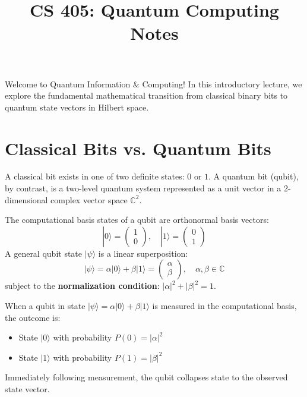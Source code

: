 \documentclass[mode=notes, palette=midnight, fontsize=11pt]{modernclassnotes}
\title{CS 405: Quantum Computing Notes}
\begin{document}
\maketitle

\tableofcontents
\newpage


Welcome to Quantum Information \& Computing! In this introductory lecture, we explore the fundamental mathematical transition from classical binary bits to quantum state vectors in Hilbert space.

\section{Classical Bits vs. Quantum Bits}

A classical bit exists in one of two definite states: $0$ or $1$. A quantum bit (qubit), by contrast, is a two-level quantum system represented as a unit vector in a 2-dimensional complex vector space $\mathbb{C}^2$.

\begin{definition}
The computational basis states of a qubit are orthonormal basis vectors:
\[
|0\rangle = \begin{pmatrix} 1 \\ 0 \end{pmatrix}, \quad |1\rangle = \begin{pmatrix} 0 \\ 1 \end{pmatrix}
\]
A general qubit state $|\psi\rangle$ is a linear superposition:
\[
|\psi\rangle = \alpha |0\rangle + \beta |1\rangle = \begin{pmatrix} \alpha \\ \beta \end{pmatrix}, \quad \alpha, \beta \in \mathbb{C}
\]
subject to the \textbf{normalization condition}: $|\alpha|^2 + |\beta|^2 = 1$.
\end{definition}

\begin{theorem}
When a qubit in state $|\psi\rangle = \alpha |0\rangle + \beta |1\rangle$ is measured in the computational basis, the outcome is:
\begin{itemize}
    \item State $|0\rangle$ with probability $P(0) = |\alpha|^2$
    \item State $|1\rangle$ with probability $P(1) = |\beta|^2$
\end{itemize}
Immediately following measurement, the qubit collapses state to the observed state vector.
\end{theorem}
\end{document}

